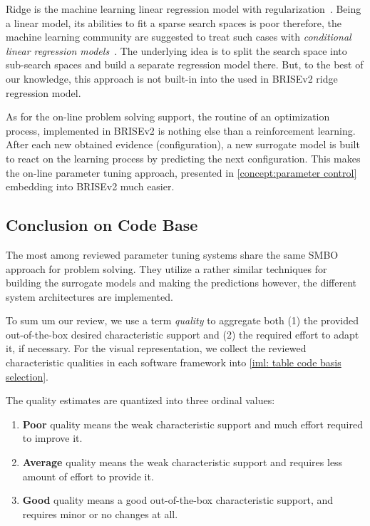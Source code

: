 Ridge is the machine learning linear regression model with regularization~\cite{hoerl1970ridge}. Being a linear model, its abilities to fit a sparse search spaces is poor therefore, the machine learning community are suggested to treat such cases with \emph{conditional linear regression models}~\cite{DBLP:journals/corr/abs-1806-02326}. The underlying idea is to split the search space into sub-search spaces and build a separate regression model there. But, to the best of our knowledge, this approach is not built-in into the used in BRISEv2 ridge regression model.

As for the on-line problem solving support, the routine of an optimization process, implemented in BRISEv2 is nothing else than a reinforcement learning. After each new obtained evidence (configuration), a new surrogate model is built to react on the learning process by predicting the next configuration. This makes the on-line parameter tuning approach, presented in \cref{concept:parameter control} embedding into BRISEv2 much easier.

\subsection{Conclusion on Code Base}\label{impl:hlh code basis conclusion}
The most among reviewed parameter tuning systems share the same SMBO approach for problem solving. They utilize a rather similar techniques for building the surrogate models and making the predictions however, the different system architectures are implemented.

To sum um our review, we use a term \emph{quality} to aggregate both (1) the provided  out-of-the-box desired characteristic support and (2) the required effort to adapt it, if necessary. For the visual representation, we collect the reviewed characteristic qualities in each software framework into \cref{iml: table code basis selection}.

The quality estimates are quantized into three ordinal values:
\begin{enumerate}
	\item \textbf{Poor} quality means the weak characteristic support and much effort required to improve it.
	\item \textbf{Average} quality means the weak characteristic support and requires less amount of effort to provide it.
	\item \textbf{Good} quality means a good out-of-the-box characteristic support, and requires minor or no changes at all.
\end{enumerate}

